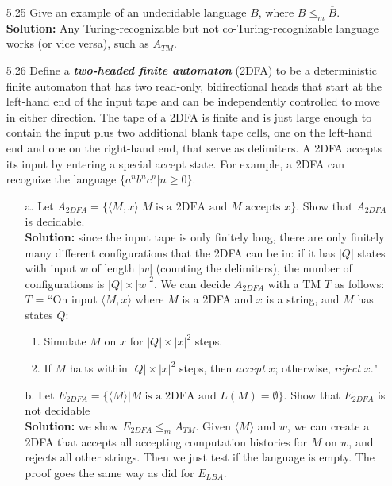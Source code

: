 \begin{enumerate}
\item[5.25]Give an example of an undecidable language $B$, where $B \le_{m} \overline{B}$.
\\
\textbf{Solution:} Any Turing-recognizable but not co-Turing-recognizable language works (or vice versa), such as $A_{TM}$.

\item[5.26]Define a \textbf{\emph{two-headed finite automaton}} (2DFA) to be a deterministic finite automaton that has two read-only, bidirectional heads that start at the left-hand end of the input tape and can be independently controlled to move in either direction. The tape of a 2DFA is finite and is just large enough to contain the input plus two additional blank tape cells, one on the left-hand end and one on the right-hand end, that serve as delimiters. A 2DFA accepts its input by entering a special accept state. For example, a 2DFA can recognize the language $\{a^nb^nc^n \vert n \ge 0\}$.
\begin{enumerate}
\item[a.]Let $A_{2DFA} = \{\langle M, x \rangle\vert M\;\text{is a 2DFA and $M$ accepts $x$}\}$. Show that $A_{2DFA}$ is decidable.
\\
\textbf{Solution:} since the input tape is only finitely long, there are only finitely many different configurations that the 2DFA can be in: if it has $|Q|$ states with input $w$ of length $|w|$ (counting the delimiters), the number of configurations is $|Q|\times|w|^2$. We can decide $A_{2DFA}$ with a TM $T$ as follows:
\\
$T$ = ``On input $\langle M, x\rangle$ where $M$ is a 2DFA and $x$ is a string, and $M$ has states $Q$:
\begin{enumerate}
\item Simulate $M$ on $x$ for $|Q|\times|x|^2$ steps.
\item If $M$ halts within $|Q|\times|x|^2$ steps, then \emph{accept} $x$; otherwise, \emph{reject} $x$."
\end{enumerate}

\item[b.]Let $E_{2DFA} = \{\langle M \rangle\vert M\;\text{is a 2DFA and $L(M) = \emptyset$}\}$. Show that $E_{2DFA}$ is not decidable
\\
\textbf{Solution:} we show $E_{2DFA} \le_m A_{TM}$. Given $\langle M \rangle$ and $w$, we can create a 2DFA that accepts all accepting computation histories for $M$ on $w$, and rejects all other strings. Then we just test if the language is empty. The proof goes the same way as did for $E_{LBA}$.
\end{enumerate}


\end{enumerate}
